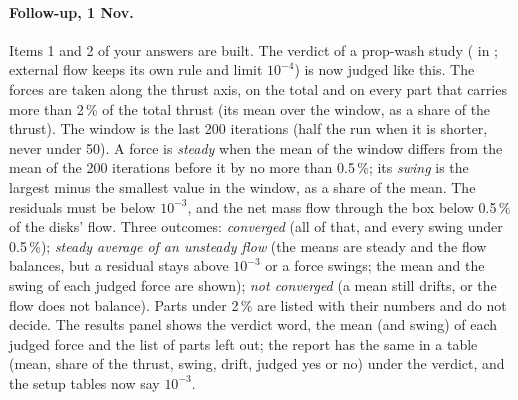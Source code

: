 \paragraph{Follow-up, 1 Nov.} Items 1 and 2 of your answers are built. The verdict of a prop-wash study
( in ; external flow keeps its own rule and limit $10^{-4}$) is now judged
like this. The forces are taken along the thrust axis, on the total and on every part that carries more than 2\,\% of the total
thrust (its mean over the window, as a share of the thrust). The window is the last 200 iterations (half the run when it is
shorter, never under 50). A force is \emph{steady} when the mean of the window differs from the mean of the 200 iterations before
it by no more than 0.5\,\%; its \emph{swing} is the largest minus the smallest value in the window, as a share of the mean.
The residuals must be below $10^{-3}$, and the net mass flow through the box below 0.5\,\% of the disks' flow. Three outcomes:
\emph{converged} (all of that, and every swing under 0.5\,\%); \emph{steady average of an unsteady flow} (the means are steady
and the flow balances, but a residual stays above $10^{-3}$ or a force swings; the mean and the swing of each judged force are
shown); \emph{not converged} (a mean still drifts, or the flow does not balance). Parts under 2\,\% are listed with their numbers
and do not decide. The results panel shows the verdict word, the mean (and swing) of each judged force and the list of
parts left out; the report has the same in a table (mean, share of the thrust, swing, drift, judged yes or no) under the
verdict, and the setup tables now say $10^{-3}$.
